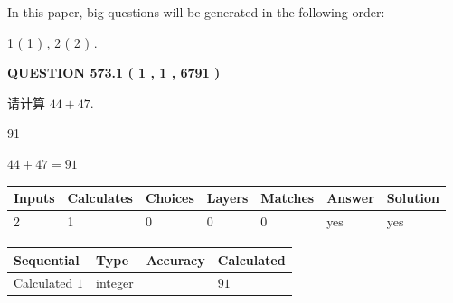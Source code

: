 \documentclass{ctexart}
\begin{document}
   
   
\vspace{0.2in}
   
In this paper, big questions will be generated in the following order: 
   
   
   1 ( 1 )
 ,
   2 ( 2 )
 .
  
\vspace{0.2in}
  
{\textbf{\Large{QUESTION
573.1 
 ( 1 , 1 , 6791 )
}}}
  
  
 
请计算 $ %
44 +  %
47 $.
 
 
 
\noindent{}
 
 

91
 
 
\noindent{}
 
 

 
 
 
\noindent{}
 
 

$ %
44 +  %
47=   %
91$
 
 
\noindent{}
 
 

 
   
   
   
   
\noindent\begin{tabular}{|l|l|l|l|l|l|l|}
 \hline
Inputs & Calculates & Choices & Layers & Matches & Answer & Solution \\ \hline
 2  & 
 1  & 
 0
  & 
 0  & 
 0  & 
  yes & 
  yes 
  \\ \hline
 \end{tabular}
   
   
   
   
\noindent{}
   
   
  
  
\noindent\begin{tabular}{|l|l|l|l|}
\hline
 Sequential & Type & Accuracy & Calculated \\ 
\hline
 
 
  Calculated $  1 $ & integer &  & 
  $ 91 $ 
 \\  \hline  
 \end{tabular}
   
\end{document}
